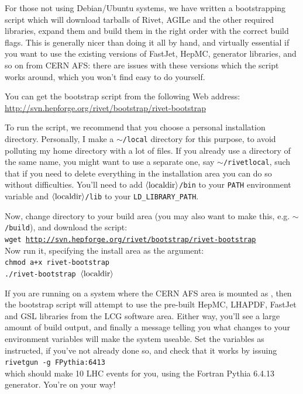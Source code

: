 \documentclass{JHEP3}
\newcommand{\kbd}[1]{\texttt{#1}\xspace}
\newcommand{\inp}[1]{\textsf{\textdollar}\hspace{1mm}\texttt{#1}\xspace}
\newcommand{\var}[1]{\texttt{\textdollar{}#1}\xspace}
\newcommand{\val}[1]{\textit{\ensuremath{\langle\text{\textrm{#1}\/}\rangle}}\xspace}
\newcommand{\home}{\texttt{\ensuremath{\sim}}\xspace}
\begin{document}
For those not using Debian/Ubuntu systems, we have written a bootstrapping
script which will download tarballs of Rivet, AGILe and the other required
libraries, expand them and build them in the right order with the correct build
flags. This is generally nicer than doing it all by hand, and virtually
essential if you want to use the existing versions of FastJet, HepMC, generator
libraries, and so on from CERN AFS: there are issues with these versions which
the script works around, which you won't find easy to do yourself.

You can get the bootstrap script from the following Web address:
\url{http://svn.hepforge.org/rivet/bootstrap/rivet-bootstrap}

To run the script, we recommend that you choose a personal installation
directory. Personally, I make a \kbd{\home/local} directory for this purpose, to
avoid polluting my home directory with a lot of files. If you already use a
directory of the same name, you might want to use a separate one, say
\kbd{\home/rivetlocal}, such that if you need to delete everything in the
installation area you can do so without difficulties. You'll need to add
\kbd{\val{localdir}/bin} to your \var{PATH} environment variable and
\kbd{\val{localdir}/lib} to your \var{LD_LIBRARY_PATH}.

Now, change directory to your build area (you may also want to make this,
e.g. \kbd{\home/build}), and download the script:\\
\inp{wget \url{http://svn.hepforge.org/rivet/bootstrap/rivet-bootstrap}}\\
Now run it, specifying the install area as the argument:\\
\inp{chmod a+x rivet-bootstrap}\\
\inp{./rivet-bootstrap \val{localdir}}

If you are running on a system where the CERN AFS area is mounted as
, then the bootstrap script will attempt to use the pre-built
HepMC, LHAPDF, FastJet and GSL libraries from the LCG software area. Either way,
you'll see a large amount of build output, and finally a message telling you
what changes to your environment variables will make the system useable. Set the
variables as instructed, if you've not already done so, and check that it works
by issuing\\
\inp{rivetgun -g FPythia:6413}\\
which should make 10 LHC events for you, using the Fortran Pythia 6.4.13
generator. You're on your way!
\end{document}
